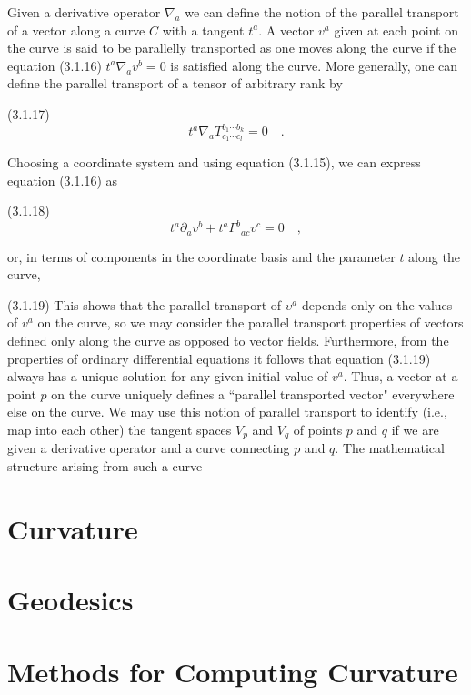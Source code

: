 Given a derivative operator $\nabla_{a}$ we can define the notion of the parallel transport of a vector along a curve $C$ with a tangent $t^a$. A vector $v^a$ given at each point on the curve is said to be parallelly transported as one moves along the curve if the equation
(3.1.16) $t^{a}\nabla_{a}v^{b}=0$
is satisfied along the curve. More generally, one can define the parallel transport of a tensor of arbitrary rank by

(3.1.17) 
$$
t^{a}\nabla_{a}T^{b_{1}\cdots b_{k}}_{c_{1}\cdots c_{l}}=0\quad.
$$

Choosing a coordinate system and using equation (3.1.15), we can express equation (3.1.16) as

(3.1.18) 
$$
t^{a}\partial_{a}v^{b}+t^{a}{\Gamma^{b}}_{ac}v^{c}=0\quad,
$$

or, in terms of components in the coordinate basis and the parameter $t$ along the curve,

(3.1.19) 
This shows that the parallel transport of $\upsilon^{a}$ depends only on the values of $v^a$ on the curve, so we may consider the parallel transport properties of vectors defined only along the curve as opposed to vector fields. Furthermore, from the properties of ordinary differential equations it follows that equation (3.1.19) always has a unique solution for any given initial value of $v^a$. Thus, a vector at a point $p$ on the curve uniquely defines a “parallel transported vector" everywhere else on the curve. We may use this notion of parallel transport to identify (i.e., map into each other) the tangent spaces $V_p$ and $V_q$ of points $p$ and $q$ if we are given a derivative operator and a curve connecting $p$ and $q$. The mathematical structure arising from such a curve-

\section{Curvature}


\section{Geodesics}
\section{Methods for Computing Curvature}

% 